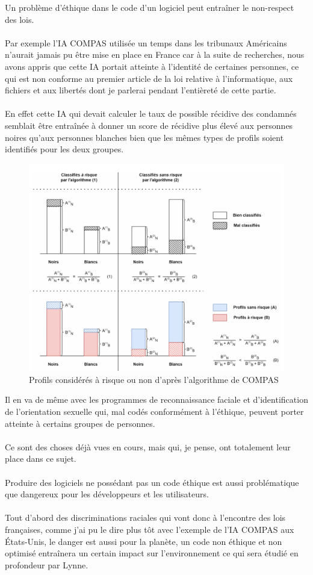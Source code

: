 \documentclass{article}
\begin{document}
Un problème d'éthique dans le code d'un logiciel peut entraîner le non-respect des lois.\\\\
Par exemple l'IA COMPAS utilisée un temps dans les tribunaux Américains n'aurait jamais pu être mise en place en France car à la suite de recherches, nous avons appris que cette IA portait atteinte à l'identité de certaines personnes, ce qui est non conforme au premier article de la loi relative à l'informatique, aux fichiers et aux libertés dont je parlerai pendant l'entièreté de cette partie.\\\\
En effet cette IA qui devait calculer le taux de possible récidive des condamnés semblait être entraînée à donner un score de récidive plus élevé aux personnes noires qu’aux personnes blanches bien que les mêmes types de profils soient identifiés pour les deux groupes.
\begin{figure}[h]
    \centering
    \includegraphics[width=0.5\linewidth]{images/Graphique COMPAS.PNG}
    \caption{Profils considérés à risque ou non d'après l'algorithme de COMPAS\cite{noauthor_compas_nodate}}
    \label{COMPAS graph}
\end{figure}
Il en va de même avec les programmes de reconnaissance faciale et d'identification de l'orientation sexuelle qui, mal codés conformément à l'éthique, peuvent porter atteinte à certains groupes de personnes.\\
\\ Ce sont des choses déjà vues en cours, mais qui, je pense, ont totalement leur place dans ce sujet.\\
\\ Produire des logiciels ne possédant pas un code éthique est aussi problématique que dangereux pour les développeurs et les utilisateurs.\\\\

 Tout d'abord des discriminations raciales qui vont donc à l'encontre des lois françaises, comme j'ai pu le dire plus tôt avec l'exemple de l'IA COMPAS aux États-Unis, le danger est aussi pour la planète, un code non éthique et non optimisé entraînera un certain impact sur l'environnement ce qui sera étudié en profondeur par Lynne.\\\\
\end{document}
